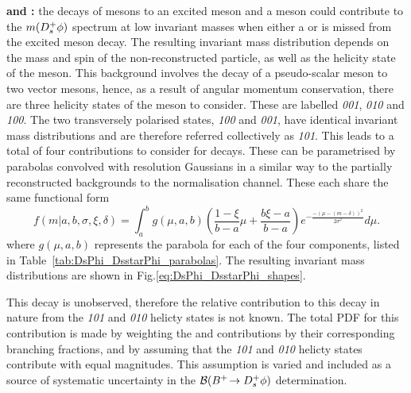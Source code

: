 \begin{description}
\item \textbf{\decay{\Bp}{(\decay{\Dssp}{\Dsp[\Pgamma]})\phiz} and \decay{\Bp}{(\decay{\Dssp}{\Dsp[\piz]})\phiz}:} the decays of \Bp mesons to an excited \Dsp meson and a \phiz meson could contribute to the $m({{D}^+_{s}}\phi)$ spectrum at low invariant masses when either a \piz or \Pgamma is missed from the excited meson decay. The resulting invariant mass distribution depends on the mass and spin of the non-reconstructed particle, as well as the helicity state of the \Dssp meson. This background involves the decay of a pseudo-scalar meson to two vector mesons, hence, as a result of angular momentum conservation, there are three helicity states of the \Dssp meson to consider. These are labelled \emph{001}, \emph{010} and \emph{100}. The two transversely polarised states, \emph{100} and \emph{001}, have identical invariant mass distributions and are therefore referred collectively as \emph{101}. This leads to a total of four contributions to consider for \decay{\Bp}{\Dssp\phiz} decays. These can be parametrised by parabolas convolved with resolution Gaussians in a similar way to the partially reconstructed backgrounds to the normalisation channel.
These each share the same functional form
\begin{equation}
f(m|a,b,\sigma,\xi, \delta) = \int_{a}^{b} g(\mu,a,b) \left( \frac{1-\xi}{b-a}\mu + \frac{b\xi-a}{b-a} \right) e^{-\frac{-(\mu-(m-\delta))^{2}}{2\sigma^{2}}} d\mu.
\label{eq:DsPhi_DsstarPhi_shapes}
\end{equation}
where $g(\mu,a,b)$ represents the parabola for each of the four components, listed in Table~\ref{tab:DsPhi_DsstarPhi_parabolas}. The resulting invariant mass distributions are shown in Fig.\ref{eq:DsPhi_DsstarPhi_shapes}.

This decay is unobserved, therefore the relative contribution to this decay in nature from the \emph{101} and \emph{010} helicty states is not known. The total PDF for this contribution is made by weighting the \piz and \Pgamma contributions by their corresponding branching fractions, and by assuming that the \emph{101} and \emph{010} helicty states contribute with equal magnitudes. This assumption is varied and included as a source of systematic uncertainty in the ${\mathcal{B}}({{{B}^+}}\!\rightarrow {\ensuremath{{D}^+_{s}}}\phi)$ determination.
\end{description}
 
